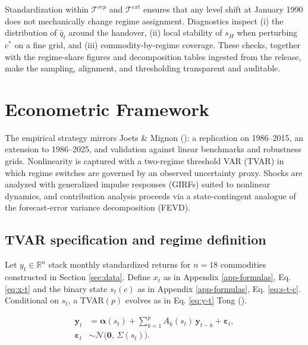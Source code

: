 \documentclass[
  11pt,
]{article}
\begin{document}
Standardization within \(\mathcal{T}^{rep}\) and \(\mathcal{T}^{ext}\) ensures that any level shift at January 1990 does not mechanically change regime assignment. Diagnostics inspect (i) the distribution of \(\tilde{q_t}\) around the handover, (ii) local stability of \(s_H\) when perturbing \(c^*\) on a fine grid, and (iii) commodity-by-regime coverage. These checks, together with the regime-share figures and decomposition tables ingested from the release, make the sampling, alignment, and thresholding transparent and auditable.

\section{Econometric Framework}\label{sec:econometric}

The empirical strategy mirrors Joets \& Mignon (): a replication on 1986--2015, an extension to 1986--2025, and validation against linear benchmarks and robustness grids. Nonlinearity is captured with a two-regime threshold VAR (TVAR) in which regime switches are governed by an observed uncertainty proxy. Shocks are analyzed with generalized impulse responses (GIRFs) suited to nonlinear dynamics, and contribution analysis proceeds via a state-contingent analogue of the forecast-error variance decomposition (FEVD).

\subsection{TVAR specification and regime definition}\label{sec:econometricone}

Let \(y_t \in \mathbb{R}^n\) stack monthly standardized returns for \(n=18\) commodities constructed in Section \ref{sec:data}. Define \(x_t\) as in Appendix \ref{app-formulas}, Eq. \eqref{eq:x-t} and the binary state \(s_t(c)\) as in Appendix \ref{app-formulas}, Eq. \eqref{eq:s-t-c}. Conditional on \(s_t\), a TVAR\((p)\) evolves as in Eq. \eqref{eq:y-t} Tong ().

\begin{equation}\label{eq:y-t}
\begin{aligned}
\mathbf{y}_t &= \boldsymbol{\alpha}(s_t)
+ \sum_{k=1}^{p} A_k(s_t)\,\mathbf{y}_{t-k}
+ \boldsymbol{\varepsilon}_t, \\
\boldsymbol{\varepsilon}_t &\sim \mathcal{N}\!\bigl(\mathbf{0},\, \Sigma(s_t)\bigr).
\end{aligned}
\end{equation}
\end{document}
